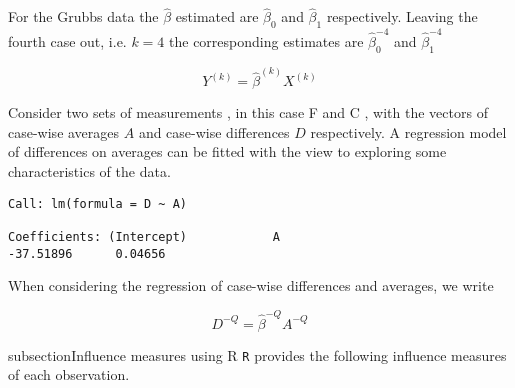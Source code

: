 \documentclass[12pt, a4paper]{article}
\begin{document}
For the Grubbs data the $\hat{\beta}$ estimated are $\hat{\beta}_{0}$ and $\hat{\beta}_{1}$ respectively. Leaving the
fourth case out, i.e. $k=4$ the corresponding estimates are $\hat{\beta}_{0}^{-4}$ and $\hat{\beta}_{1}^{-4}$

\begin{equation}
Y^{(k)} = \hat{\beta}^{(k)}X^{(k)}
\end{equation}

Consider two sets of measurements , in this case F and C , with the vectors of case-wise averages $A$ and case-wise differences $D$ respectively. A regression model of differences on averages can be fitted with the view to exploring some characteristics of the data.

\begin{verbatim}
Call: lm(formula = D ~ A)

Coefficients: (Intercept)            A
-37.51896      0.04656

\end{verbatim}




When considering the regression of case-wise differences and averages, we write

\begin{equation}
D^{-Q} = \hat{\beta}^{-Q}A^{-Q}
\end{equation}



subsection{Influence measures using R} %
\texttt{R} provides the following influence measures of each observation.

\end{document}
